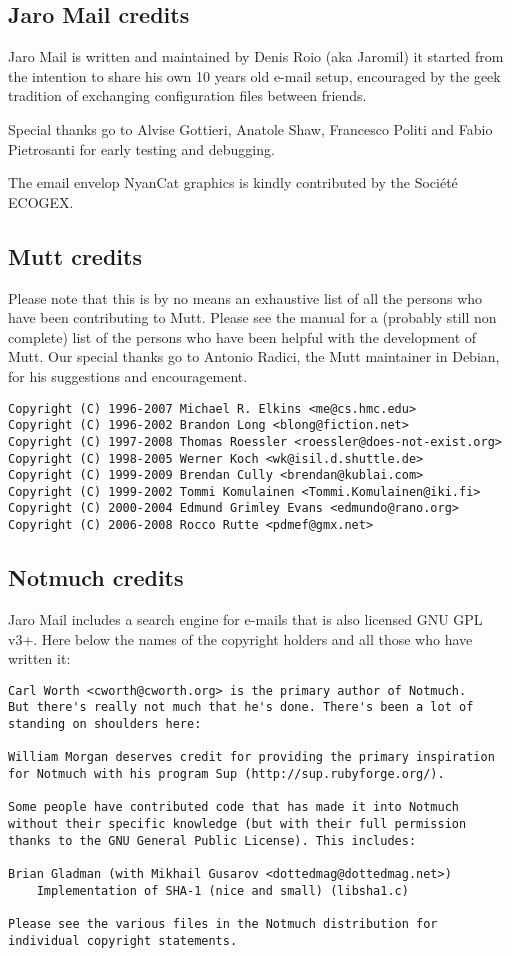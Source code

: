 \documentclass[a4,onecolumn,portrait]{article}
\begin{document}
\subsection{Jaro Mail credits}
\label{sec-12-2}

Jaro Mail is written and maintained by Denis Roio (aka Jaromil) it
started from the intention to share his own 10 years old e-mail setup,
encouraged by the geek tradition of exchanging configuration files
between friends.

Special thanks go to Alvise Gottieri, Anatole Shaw, Francesco Politi
and Fabio Pietrosanti for early testing and debugging.

The email envelop NyanCat graphics is kindly contributed by the
Société ECOGEX.
\subsection{Mutt credits}
\label{sec-12-3}

Please note that this is by no means an exhaustive list of all the
persons who have been contributing to Mutt.  Please see the
manual for a (probably still non complete) list of the persons who
have been helpful with the development of Mutt. Our special thanks go to
Antonio Radici, the Mutt maintainer in Debian, for his suggestions and
encouragement.

\begin{verbatim}
Copyright (C) 1996-2007 Michael R. Elkins <me@cs.hmc.edu>
Copyright (C) 1996-2002 Brandon Long <blong@fiction.net>
Copyright (C) 1997-2008 Thomas Roessler <roessler@does-not-exist.org>
Copyright (C) 1998-2005 Werner Koch <wk@isil.d.shuttle.de>
Copyright (C) 1999-2009 Brendan Cully <brendan@kublai.com>
Copyright (C) 1999-2002 Tommi Komulainen <Tommi.Komulainen@iki.fi>
Copyright (C) 2000-2004 Edmund Grimley Evans <edmundo@rano.org>
Copyright (C) 2006-2008 Rocco Rutte <pdmef@gmx.net>
\end{verbatim}
\subsection{Notmuch credits}
\label{sec-12-4}
Jaro Mail includes a search engine for e-mails that is also licensed
GNU GPL v3+. Here below the names of the copyright holders and all
those who have written it:

\begin{verbatim}
Carl Worth <cworth@cworth.org> is the primary author of Notmuch.
But there's really not much that he's done. There's been a lot of
standing on shoulders here:

William Morgan deserves credit for providing the primary inspiration
for Notmuch with his program Sup (http://sup.rubyforge.org/).

Some people have contributed code that has made it into Notmuch
without their specific knowledge (but with their full permission
thanks to the GNU General Public License). This includes:

Brian Gladman (with Mikhail Gusarov <dottedmag@dottedmag.net>)
	Implementation of SHA-1 (nice and small) (libsha1.c)

Please see the various files in the Notmuch distribution for
individual copyright statements.
\end{verbatim}
\end{document}
